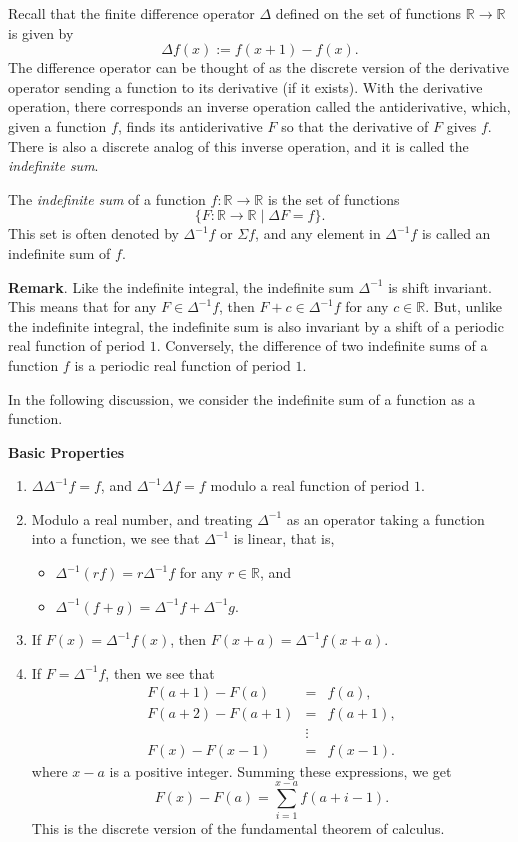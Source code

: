 \documentclass[12pt]{article}
\begin{document}
Recall that the finite difference operator $\Delta$ defined on the set of functions $\mathbb{R}\to \mathbb{R}$ is given by $$\Delta f(x):= f(x+1)-f(x).$$
The difference operator can be thought of as the discrete version of the derivative operator sending a function to its derivative (if it exists).  With the derivative operation, there corresponds an inverse operation called the antiderivative, which, given a function $f$, finds its antiderivative $F$ so that the derivative of $F$ gives $f$.  There is also a discrete analog of this inverse operation, and it is called the \emph{indefinite sum}.

The \emph{indefinite sum} of a function $f:\mathbb{R}\to \mathbb{R}$ is the set of functions $$\lbrace F:\mathbb{R}\to \mathbb{R}\mid \Delta F = f \rbrace.$$
This set is often denoted by $\Delta^{-1}f$ or $\Sigma f$, and any element in $\Delta^{-1}f$ is called an indefinite sum of $f$.

\textbf{Remark}.  Like the indefinite integral, the indefinite sum $\Delta^{-1}$ is shift invariant.  This means that for any $F\in \Delta^{-1} f$, then $F+c \in \Delta^{-1} f$ for any $c\in \mathbb{R}$.  But, unlike the indefinite integral, the indefinite sum is also invariant by a shift of a periodic real function of period $1$.  Conversely, the difference of two indefinite sums of a function $f$ is a periodic real function of period $1$.

In the following discussion, we consider the indefinite sum of a function as a function.

\textbf{Basic Properties}
\begin{enumerate}
\item $\Delta \Delta^{-1}f =f$, and $\Delta^{-1} \Delta f=f$ modulo a real function of period $1$.
\item Modulo a real number, and treating $\Delta^{-1}$ as an operator taking a function into a function, we see that $\Delta^{-1}$ is linear, that is, 
\begin{itemize}
\item $\Delta^{-1} (rf) = r\Delta^{-1} f$ for any $r\in \mathbb{R}$, and 
\item $\Delta^{-1}(f+g)=\Delta^{-1}f +\Delta^{-1}g$.
\end{itemize}
\item If $F(x)=\Delta^{-1}f(x)$, then $F(x+a)=\Delta^{-1}f(x+a)$.
\item If $F=\Delta^{-1}f$, then we see that 
\begin{eqnarray*}
F(a+1)-F(a) &=& f(a), \\ F(a+2)-F(a+1)&=& f(a+1), \\ &\vdots& \\ F(x)-F(x-1)&=& f(x-1).  
\end{eqnarray*}
where $x-a$ is a positive integer.  Summing these expressions, we get $$F(x)-F(a)=\sum_{i=1}^{x-a} f(a+i-1).$$  This is the discrete version of the fundamental theorem of calculus.
\end{enumerate}
\end{document}
